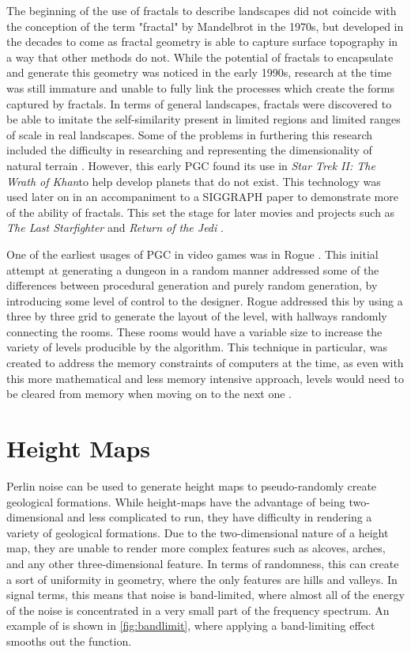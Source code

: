 \documentclass[10pt]{report}
\begin{document}
		The beginning of the use of fractals to describe landscapes did not coincide with the conception of the term "fractal" by Mandelbrot in the 1970s, but developed in the decades to come as fractal geometry is able to capture surface topography in a way that other methods do not. While the potential of fractals to encapsulate and generate this geometry was noticed in the early 1990s, research at the time was still immature and unable to fully link the processes which create the forms captured by fractals. In terms of general landscapes, fractals were discovered to be able to imitate the self-similarity present in limited regions and limited ranges of scale in real landscapes. Some of the problems in furthering this research included the difficulty in researching and representing the dimensionality of natural terrain \cite{XU1993245}. However, this early PGC found its use in \emph{Star Trek II: The Wrath of Khan}to help develop planets that do not exist. This technology was used later on in an accompaniment to a SIGGRAPH paper to demonstrate more of the ability of fractals. This set the stage for later movies and projects such as \emph{The Last Starfighter} and \emph{Return of the Jedi} \cite{ibm-fractal}. 
		
		One of the earliest usages of PGC in video games was in Rogue \cite{rogue}. This initial attempt at generating a dungeon in a random manner addressed some of the differences between procedural generation and purely random generation, by introducing some level of control to the designer. Rogue addressed this by using a three by three grid to generate the layout of the level, with hallways randomly connecting the rooms. These rooms would have a variable size to increase the variety of levels producible by the algorithm. This technique in particular, was created to address the memory constraints of computers at the time, as even with this more mathematical and less memory intensive approach, levels would need to be cleared from memory when moving on to the next one \cite{rogue}.
		
	\vspace{10pt}
	\let\clearpage\relax
	\chapter{Height Maps}
	
		Perlin noise can be used to generate height maps to pseudo-randomly create geological formations. While height-maps have the advantage of being two-dimensional and less complicated to run, they have difficulty in rendering a variety of geological formations. Due to the two-dimensional nature of a height map, they are unable to render more complex features such as alcoves, arches, and any other three-dimensional feature. In terms of randomness, this can create a sort of uniformity in geometry, where the only features are hills and valleys. In signal terms, this means that noise is band-limited, where almost all of the energy of the noise is concentrated in a very small part of the frequency spectrum. An example of is shown in \autoref{fig:bandlimit}, where applying a band-limiting effect smooths out the function.
		
\end{document}
